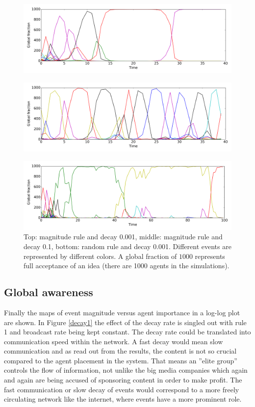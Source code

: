 \documentclass [12pt,a4paper,twoside]{article}
\begin{document}
\begin{figure}[H]
\includegraphics[scale=0.4]{report/event_histories/time_evolution_r1_decay0001_short}

\end{figure}
\begin{figure}[h!]
\includegraphics[scale=0.4]{report/event_histories/time_evolution_r1_decay0100_short}
\end{figure}
\begin{figure}[h!]
\includegraphics[scale=0.4]{report/event_histories/time_evolution_r2_decay0001}
\caption{Top: magnitude rule and decay 0.001, middle: magnitude rule and decay 0.1, bottom: random rule and decay 0.001. Different events are represented by different colors. A global fraction of $1000$ represents full acceptance of an idea (there are 1000 agents in the simulations).}
\label{event_history}
\end{figure}

\subsection{Global awareness}
Finally the maps of event magnitude versus agent importance in a log-log plot are shown. In Figure \ref{decay1} the effect of the decay rate is singled out with rule 1 and broadcast rate being kept constant. The decay rate could be translated into communication speed within the network. A fast decay would mean slow communication and as read out from the results, the content is not so crucial compared to the agent placement in the system. That means an ''elite group'' controls the flow of information, not unlike the big media companies which again and again are being accused of sponsoring content in order to make profit. The fast communication or slow decay of events would correspond to a more freely circulating network like the internet, where events have a more prominent role.
\end{document}
